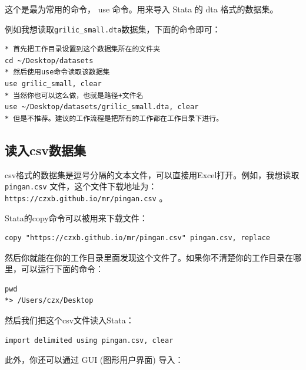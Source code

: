 \documentclass[]{ctexbook}
\begin{document}
这个是最为常用的命令， use 命令。用来导入 Stata 的 dta 格式的数据集。

例如我想读取\texttt{grilic\_small.dta}数据集，下面的命令即可：

\begin{lstlisting}
* 首先把工作目录设置到这个数据集所在的文件夹
cd ~/Desktop/datasets
* 然后使用use命令读取该数据集
use grilic_small, clear
* 当然你也可以这么做，也就是路径+文件名
use ~/Desktop/datasets/grilic_small.dta, clear
* 但是不推荐。建议的工作流程是把所有的工作都在工作目录下进行。
\end{lstlisting}

\hypertarget{csv}{%
\subsection{读入csv数据集}\label{csv}}

csv格式的数据集是逗号分隔的文本文件，可以直接用Excel打开。例如，我想读取 \texttt{pingan.csv} 文件，这个文件下载地址为：\texttt{https://czxb.github.io/mr/pingan.csv} 。

Stata的copy命令可以被用来下载文件：

\begin{lstlisting}
copy "https://czxb.github.io/mr/pingan.csv" pingan.csv, replace
\end{lstlisting}

然后你就能在你的工作目录里面发现这个文件了。如果你不清楚你的工作目录在哪里，可以运行下面的命令：

\begin{lstlisting}
pwd
*> /Users/czx/Desktop
\end{lstlisting}

然后我们把这个csv文件读入Stata：

\begin{lstlisting}
import delimited using pingan.csv, clear
\end{lstlisting}

此外，你还可以通过 GUI (图形用户界面) 导入：
\end{document}
